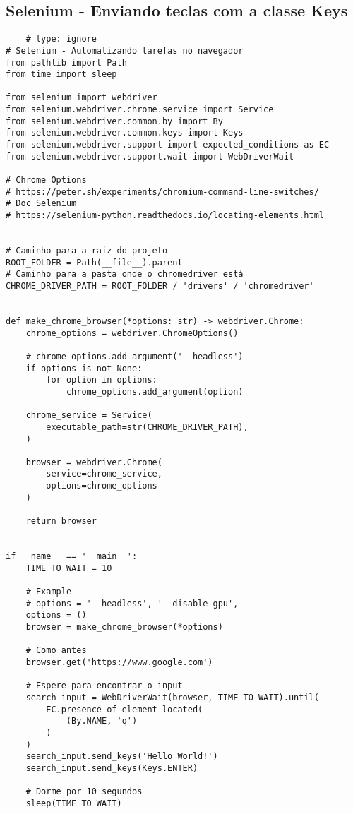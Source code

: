 \documentclass{article}
\begin{document}
\subsection{Selenium - Enviando teclas com a classe Keys}
\begin{lstlisting}
    # type: ignore
# Selenium - Automatizando tarefas no navegador
from pathlib import Path
from time import sleep

from selenium import webdriver
from selenium.webdriver.chrome.service import Service
from selenium.webdriver.common.by import By
from selenium.webdriver.common.keys import Keys
from selenium.webdriver.support import expected_conditions as EC
from selenium.webdriver.support.wait import WebDriverWait

# Chrome Options
# https://peter.sh/experiments/chromium-command-line-switches/
# Doc Selenium
# https://selenium-python.readthedocs.io/locating-elements.html


# Caminho para a raiz do projeto
ROOT_FOLDER = Path(__file__).parent
# Caminho para a pasta onde o chromedriver está
CHROME_DRIVER_PATH = ROOT_FOLDER / 'drivers' / 'chromedriver'


def make_chrome_browser(*options: str) -> webdriver.Chrome:
    chrome_options = webdriver.ChromeOptions()

    # chrome_options.add_argument('--headless')
    if options is not None:
        for option in options:
            chrome_options.add_argument(option)

    chrome_service = Service(
        executable_path=str(CHROME_DRIVER_PATH),
    )

    browser = webdriver.Chrome(
        service=chrome_service,
        options=chrome_options
    )

    return browser


if __name__ == '__main__':
    TIME_TO_WAIT = 10

    # Example
    # options = '--headless', '--disable-gpu',
    options = ()
    browser = make_chrome_browser(*options)

    # Como antes
    browser.get('https://www.google.com')

    # Espere para encontrar o input
    search_input = WebDriverWait(browser, TIME_TO_WAIT).until(
        EC.presence_of_element_located(
            (By.NAME, 'q')
        )
    )
    search_input.send_keys('Hello World!')
    search_input.send_keys(Keys.ENTER)

    # Dorme por 10 segundos
    sleep(TIME_TO_WAIT)
\end{lstlisting}
\end{document}
